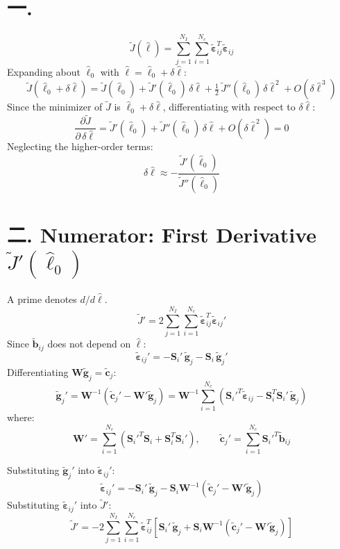\documentclass[11pt]{article}
\newcommand{\lh}{\hat{\ell}}
\newcommand{\dl}{\delta\hat{\ell}}
\begin{document}
\section*{{\cjk 一.}}

\[
\tilde{J}(\lh)=\sum_{j=1}^{N_I}\sum_{i=1}^{N_c}\tilde{\boldsymbol{\varepsilon}}_{ij}^{T}\tilde{\boldsymbol{\varepsilon}}_{ij}
\]
Expanding about $\lh_0$ with $\lh=\lh_0+\dl$:
\[
\tilde{J}(\lh_0+\dl)=\tilde{J}(\lh_0)+\tilde{J}'(\lh_0)\,\dl+\tfrac12\,\tilde{J}''(\lh_0)\,\dl^{\,2}+O\!\left(\dl^{\,3}\right)
\]
Since the minimizer of $\tilde{J}$ is $\lh_0+\dl$, differentiating with respect to $\dl$:
\[
\frac{\partial\tilde{J}}{\partial\,\dl}=\tilde{J}'(\lh_0)+\tilde{J}''(\lh_0)\,\dl+O\!\left(\dl^{\,2}\right)=0
\]
Neglecting the higher-order terms:
\[
\dl\approx-\frac{\tilde{J}'(\lh_0)}{\tilde{J}''(\lh_0)}
\]

\section*{{\cjk 二.} Numerator: First Derivative $\tilde{J}'(\hat{\ell}_0)$}

A prime denotes $d/d\lh$.
\[
\tilde{J}'=2\sum_{j=1}^{N_I}\sum_{i=1}^{N_c}\tilde{\boldsymbol{\varepsilon}}_{ij}^{T}\tilde{\boldsymbol{\varepsilon}}_{ij}'
\]
Since $\tilde{\mathbf{b}}_{ij}$ does not depend on $\lh$:
\[
\tilde{\boldsymbol{\varepsilon}}_{ij}'=-\mathbf{S}_i'\,\tilde{\mathbf{g}}_j-\mathbf{S}_i\,\tilde{\mathbf{g}}_j'
\]
Differentiating $\mathbf{W}\tilde{\mathbf{g}}_j=\tilde{\mathbf{c}}_j$:
\[
\tilde{\mathbf{g}}_j'=\mathbf{W}^{-1}\left(\tilde{\mathbf{c}}_j'-\mathbf{W}'\tilde{\mathbf{g}}_j\right)
=\mathbf{W}^{-1}\sum_{i=1}^{N_c}\left(\mathbf{S}_i'^{T}\tilde{\boldsymbol{\varepsilon}}_{ij}-\mathbf{S}_i^{T}\mathbf{S}_i'\,\tilde{\mathbf{g}}_j\right)
\]
where:
\[
\mathbf{W}'=\sum_{i=1}^{N_c}\left(\mathbf{S}_i'^{T}\mathbf{S}_i+\mathbf{S}_i^{T}\mathbf{S}_i'\right),\qquad
\tilde{\mathbf{c}}_j'=\sum_{i=1}^{N_c}\mathbf{S}_i'^{T}\tilde{\mathbf{b}}_{ij}
\]

Substituting $\tilde{\mathbf{g}}_j'$ into $\tilde{\boldsymbol{\varepsilon}}_{ij}'$:
\[
\tilde{\boldsymbol{\varepsilon}}_{ij}'=-\mathbf{S}_i'\,\tilde{\mathbf{g}}_j-\mathbf{S}_i\mathbf{W}^{-1}\left(\tilde{\mathbf{c}}_j'-\mathbf{W}'\tilde{\mathbf{g}}_j\right)
\]
Substituting $\tilde{\boldsymbol{\varepsilon}}_{ij}'$ into $\tilde{J}'$:
\[
\tilde{J}'=-2\sum_{j=1}^{N_I}\sum_{i=1}^{N_c}\tilde{\boldsymbol{\varepsilon}}_{ij}^{T}
\left[\mathbf{S}_i'\,\tilde{\mathbf{g}}_j+\mathbf{S}_i\mathbf{W}^{-1}\left(\tilde{\mathbf{c}}_j'-\mathbf{W}'\tilde{\mathbf{g}}_j\right)\right]
\]
\end{document}
